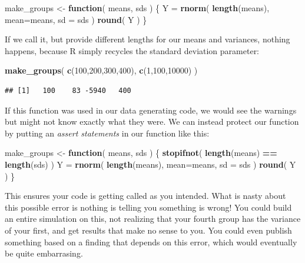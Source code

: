 \documentclass[
]{book}
\newenvironment{Shaded}{\begin{snugshade}}{\end{snugshade}}
\newcommand{\AttributeTok}[1]{\textcolor[rgb]{0.13,0.29,0.53}{#1}}
\newcommand{\ControlFlowTok}[1]{\textcolor[rgb]{0.13,0.29,0.53}{\textbf{#1}}}
\newcommand{\DecValTok}[1]{\textcolor[rgb]{0.00,0.00,0.81}{#1}}
\newcommand{\FunctionTok}[1]{\textcolor[rgb]{0.13,0.29,0.53}{\textbf{#1}}}
\newcommand{\NormalTok}[1]{#1}
\newcommand{\OtherTok}[1]{\textcolor[rgb]{0.56,0.35,0.01}{#1}}
\newcommand{\SpecialCharTok}[1]{\textcolor[rgb]{0.81,0.36,0.00}{\textbf{#1}}}
\begin{document}
\begin{Shaded}
\begin{Highlighting}[]
\NormalTok{make\_groups }\OtherTok{\textless{}{-}} \ControlFlowTok{function}\NormalTok{( means, sds ) \{}
\NormalTok{  Y }\OtherTok{=} \FunctionTok{rnorm}\NormalTok{( }\FunctionTok{length}\NormalTok{(means), }\AttributeTok{mean=}\NormalTok{means, }\AttributeTok{sd =}\NormalTok{ sds )}
  \FunctionTok{round}\NormalTok{( Y )}
\NormalTok{\}}
\end{Highlighting}
\end{Shaded}

If we call it, but provide different lengths for our means and variances, nothing happens, because R simply recycles the standard deviation parameter:

\begin{Shaded}
\begin{Highlighting}[]
\FunctionTok{make\_groups}\NormalTok{( }\FunctionTok{c}\NormalTok{(}\DecValTok{100}\NormalTok{,}\DecValTok{200}\NormalTok{,}\DecValTok{300}\NormalTok{,}\DecValTok{400}\NormalTok{), }\FunctionTok{c}\NormalTok{(}\DecValTok{1}\NormalTok{,}\DecValTok{100}\NormalTok{,}\DecValTok{10000}\NormalTok{) )}
\end{Highlighting}
\end{Shaded}

\begin{verbatim}
## [1]   100    83 -5940   400
\end{verbatim}

If this function was used in our data generating code, we would see the warnings but might not know exactly what they were.
We can instead protect our function by putting an \emph{assert statements} in our function like this:

\begin{Shaded}
\begin{Highlighting}[]
\NormalTok{make\_groups }\OtherTok{\textless{}{-}} \ControlFlowTok{function}\NormalTok{( means, sds ) \{}
  \FunctionTok{stopifnot}\NormalTok{( }\FunctionTok{length}\NormalTok{(means) }\SpecialCharTok{==} \FunctionTok{length}\NormalTok{(sds) )}
\NormalTok{  Y }\OtherTok{=} \FunctionTok{rnorm}\NormalTok{( }\FunctionTok{length}\NormalTok{(means), }\AttributeTok{mean=}\NormalTok{means, }\AttributeTok{sd =}\NormalTok{ sds )}
  \FunctionTok{round}\NormalTok{( Y )}
\NormalTok{\}}
\end{Highlighting}
\end{Shaded}

This ensures your code is getting called as you intended.
What is nasty about this possible error is nothing is telling you something is wrong!
You could build an entire simulation on this, not realizing that your fourth group has the variance of your first, and get results that make no sense to you.
You could even publish something based on a finding that depends on this error, which would eventually be quite embarrasing.
\end{document}
